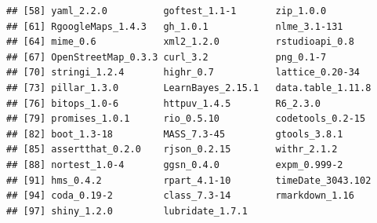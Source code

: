 \documentclass[12pt,a4paper,oneside, openany]{book}
\theoremstyle{definition}
\theoremstyle{definition}
\theoremstyle{definition}
\theoremstyle{remark}
\begin{document}
\begin{verbatim}
## [58] yaml_2.2.0          goftest_1.1-1       zip_1.0.0          
## [61] RgoogleMaps_1.4.3   gh_1.0.1            nlme_3.1-131       
## [64] mime_0.6            xml2_1.2.0          rstudioapi_0.8     
## [67] OpenStreetMap_0.3.3 curl_3.2            png_0.1-7          
## [70] stringi_1.2.4       highr_0.7           lattice_0.20-34    
## [73] pillar_1.3.0        LearnBayes_2.15.1   data.table_1.11.8  
## [76] bitops_1.0-6        httpuv_1.4.5        R6_2.3.0           
## [79] promises_1.0.1      rio_0.5.10          codetools_0.2-15   
## [82] boot_1.3-18         MASS_7.3-45         gtools_3.8.1       
## [85] assertthat_0.2.0    rjson_0.2.15        withr_2.1.2        
## [88] nortest_1.0-4       ggsn_0.4.0          expm_0.999-2       
## [91] hms_0.4.2           rpart_4.1-10        timeDate_3043.102  
## [94] coda_0.19-2         class_7.3-14        rmarkdown_1.16     
## [97] shiny_1.2.0         lubridate_1.7.1
\end{verbatim}
\end{document}
